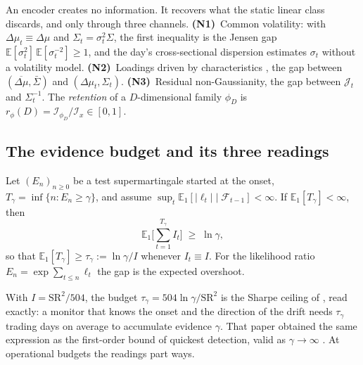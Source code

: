 An encoder creates no information. It recovers what the static linear class discards, and only through three channels. \textbf{(N1)}~Common volatility: with $\Delta\mu_t\equiv\Delta\mu$ and $\Sigma_t=\sigma_t^2\Sigma$, the first inequality is the Jensen gap $\mathbb{E}[\sigma_t^2]\,\mathbb{E}[\sigma_t^{-2}]\ge1$, and the day's cross-sectional dispersion estimates $\sigma_t$ without a volatility model. \textbf{(N2)}~Loadings driven by characteristics \citep{kelly_2019,alouadi_lehalle_2026}, the gap between $(\overline{\Delta\mu},\bar\Sigma)$ and $(\Delta\mu_t,\Sigma_t)$. \textbf{(N3)}~Residual non-Gaussianity, the gap between $\mathcal{J}_t$ and $\Sigma_t^{-1}$. The \emph{retention} of a $D$-dimensional family $\phi_D$ is $r_\phi(D)=\mathcal{I}_{\phi_D}/\mathcal{I}_x\in[0,1]$.

\subsection{The evidence budget and its three readings}\label{sec:floor}

\begin{lemma}\label{lem:budget}
Let $(E_n)_{n\ge0}$ be a test supermartingale started at the onset, $T_\gamma=\inf\{n:E_n\ge\gamma\}$, and assume $\sup_t\mathbb{E}_1[|\ell_t|\mid\mathcal{F}_{t-1}]<\infty$. If $\mathbb{E}_1[T_\gamma]<\infty$, then
\begin{equation}\label{eq:budget}
\mathbb{E}_1\Big[\textstyle\sum_{t=1}^{T_\gamma} I_t\Big]\;\ge\;\ln\gamma ,
\end{equation}
so that $\mathbb{E}_1[T_\gamma]\ge\tau_\gamma:=\ln\gamma/I$ whenever $I_t\equiv I$. For the likelihood ratio $E_n=\exp\sum_{t\le n}\ell_t$ the gap is the expected overshoot.
\end{lemma}

With $I=\mathrm{SR}^2/504$, the budget $\tau_\gamma=504\ln\gamma/\mathrm{SR}^2$ is the Sharpe ceiling of \citet{whitening_2026}, read exactly: a monitor that knows the onset and the direction of the drift needs $\tau_\gamma$ trading days on average to accumulate evidence $\gamma$. That paper obtained the same expression as the first-order bound of quickest detection, valid as $\gamma\to\infty$ \citep{lai_1998,tartakovsky_2014}. At operational budgets the readings part ways.

